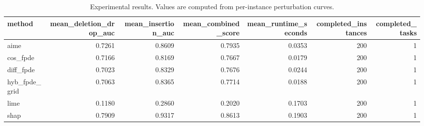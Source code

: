 \begin{table}[t]
\caption{Experimental results. Values are computed from per-instance perturbation curves.}
\label{tab:main_results_computed}
\centering
\begin{tabular}{lrrrrrr}
\toprule
method & mean\_deletion\_drop\_auc & mean\_insertion\_auc & mean\_combined\_score & mean\_runtime\_seconds & completed\_instances & completed\_tasks \\
\midrule
aime & 0.7261 & 0.8609 & 0.7935 & 0.0353 & 200 & 1 \\
cos\_fpde & 0.7166 & 0.8169 & 0.7667 & 0.0179 & 200 & 1 \\
diff\_fpde & 0.7023 & 0.8329 & 0.7676 & 0.0244 & 200 & 1 \\
hyb\_fpde\_grid & 0.7063 & 0.8365 & 0.7714 & 0.0188 & 200 & 1 \\
lime & 0.1180 & 0.2860 & 0.2020 & 0.1703 & 200 & 1 \\
shap & 0.7909 & 0.9317 & 0.8613 & 0.1903 & 200 & 1 \\
\bottomrule
\end{tabular}

\end{table}
